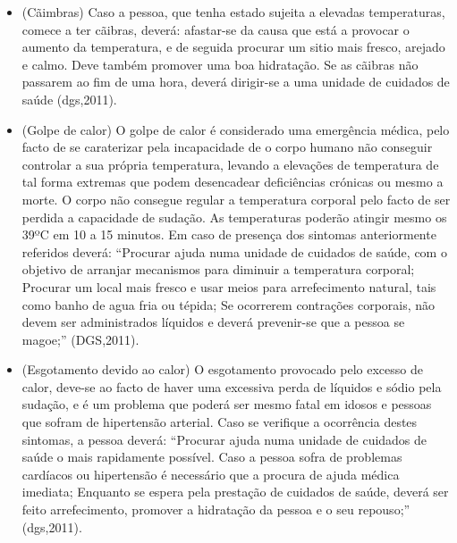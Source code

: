 \documentclass{report}
\begin{document}
\begin{itemize}
\item (Cãimbras) Caso a pessoa, que tenha estado sujeita a elevadas temperaturas, comece a ter cãibras, deverá: afastar-se da causa que está a provocar o aumento da temperatura, e de seguida procurar um sitio mais fresco, arejado e calmo. Deve também promover uma boa hidratação. Se as cãibras não passarem ao fim de uma hora, deverá dirigir-se a uma unidade de cuidados de saúde (\ac{dgs},2011).
\item (Golpe de calor) O golpe de calor é considerado uma emergência médica, pelo facto de se caraterizar pela incapacidade de o corpo humano não conseguir controlar a sua própria temperatura, levando a elevações de temperatura de tal forma extremas que podem desencadear deficiências crónicas ou mesmo a morte. O corpo não consegue regular a temperatura corporal pelo facto de ser perdida a capacidade de sudação. As temperaturas poderão atingir mesmo os 39ºC em 10 a 15 minutos.
Em caso de presença dos sintomas anteriormente referidos deverá: “Procurar ajuda numa unidade de cuidados de saúde, com o objetivo de arranjar mecanismos para diminuir a temperatura corporal; Procurar um local mais fresco e usar meios para arrefecimento natural, tais como banho de agua fria ou tépida; Se ocorrerem contrações corporais, não devem ser administrados líquidos e deverá prevenir-se que a pessoa se magoe;” (DGS,2011).
\item (Esgotamento devido ao calor) O esgotamento provocado pelo excesso de calor, deve-se ao facto de haver uma excessiva perda de líquidos e sódio pela sudação, e é um problema que poderá ser mesmo fatal em idosos e pessoas que sofram de hipertensão arterial.
Caso se verifique a ocorrência destes sintomas, a pessoa deverá: “Procurar ajuda numa unidade de cuidados de saúde o mais rapidamente possível. Caso a pessoa sofra de problemas cardíacos ou hipertensão é necessário que a procura de ajuda médica imediata; Enquanto se espera pela prestação de cuidados de saúde, deverá ser feito arrefecimento, promover a hidratação da pessoa e o seu repouso;” (\ac{dgs},2011).
\end{itemize}
\end{document}
